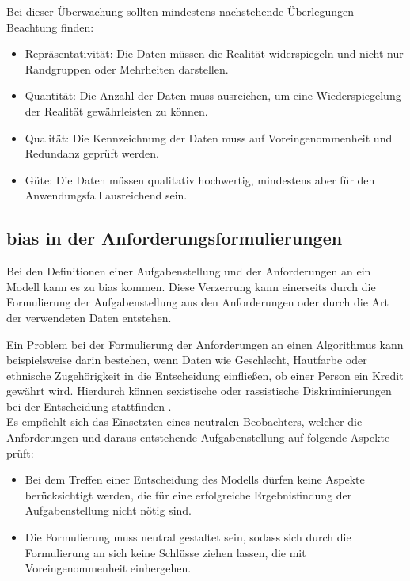 \documentclass[hidelinks,12pt]{report}
\begin{document}
Bei dieser Überwachung sollten mindestens nachstehende Überlegungen Beachtung finden: \\%
\begin{itemize}

    \item Repräsentativität: Die Daten müssen die Realität widerspiegeln und nicht nur Randgruppen oder Mehrheiten darstellen.
    \item Quantität: Die Anzahl der Daten muss ausreichen,  um eine Wiederspiegelung der Realität gewährleisten zu können.
    \item Qualität: Die Kennzeichnung der Daten muss auf Voreingenommenheit und Redundanz geprüft werden.
    \item Güte: Die Daten müssen qualitativ hochwertig, mindestens aber für den Anwendungsfall ausreichend sein.

\end{itemize}

\subsection{\Gls{bias}  in der Anforderungsformulierungen}
Bei den Definitionen einer Aufgabenstellung und der Anforderungen an ein Modell kann es zu \Gls{bias}  kommen. Diese Verzerrung kann einerseits durch die Formulierung der Aufgabenstellung aus den Anforderungen oder durch die Art der verwendeten Daten entstehen.  \cite[S. 51f.]{Srinivasan} 

Ein Problem bei der Formulierung der Anforderungen an einen Algorithmus kann beispielsweise darin bestehen, wenn Daten wie Geschlecht, Hautfarbe oder ethnische Zugehörigkeit in die Entscheidung einfließen, ob einer Person ein Kredit gewährt wird. Hierdurch können sexistische oder rassistische Diskriminierungen bei der Entscheidung stattfinden \cite[S. 51f.]{Srinivasan}.\\

Es empfiehlt sich das Einsetzten eines neutralen Beobachters, welcher die Anforderungen und daraus entstehende Aufgabenstellung auf folgende Aspekte prüft: \\%
\begin{itemize}
    \item Bei dem Treffen einer Entscheidung des Modells dürfen keine Aspekte berücksichtigt werden, die für eine erfolgreiche Ergebnisfindung der Aufgabenstellung nicht nötig sind.
    \item Die Formulierung muss neutral gestaltet sein, sodass sich durch die Formulierung an sich keine Schlüsse ziehen lassen, die mit Voreingenommenheit einhergehen.
\end{itemize}
\end{document}
